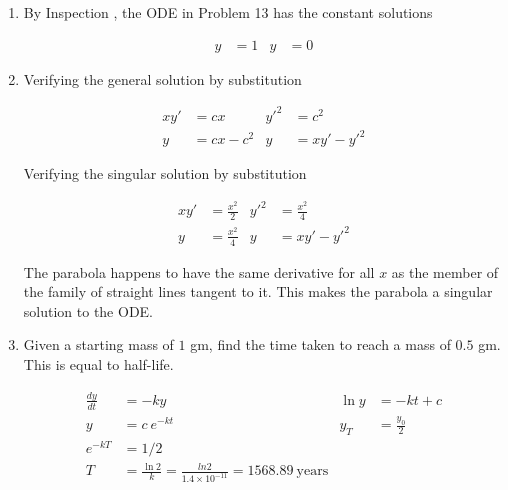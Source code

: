 \begin{enumerate}
    \item By Inspection , the ODE in Problem 13 has the constant solutions

          \begin{align}
              y & = 1 &
              y & = 0
          \end{align}


    \item Verifying the general solution by substitution

          \begin{align}
              xy'    & = cx           &
              y'^{2} & = c^{2}          \\
              y      & = cx - c^{2}   &
              y      & = xy' - y'^{2}
          \end{align}

          Verifying the singular solution by substitution

          \begin{align}
              xy'    & = \frac{x^{2}}{2} &
              y'^{2} & = \frac{x^{2}}{4}   \\
              y      & = \frac{x^{2}}{4} &
              y      & = xy' - y'^{2}
          \end{align}

          The parabola happens to have the same derivative for all $x$ as the member of
          the family of straight lines tangent to it. This makes the parabola a
          singular solution to the ODE.

    \item Given a starting mass of $1$ gm, find the time taken to reach a mass of $0.5$
          gm. This is equal to half-life.

          \begin{align}
              \frac{dy}{dt} & = -ky                                                &
              \ln y         & = -kt + c                                              \\
              y             & = c \ e^{-kt}                                        &
              y_{T}         & = \frac{y_{0}}{2}                                      \\
              e^{-kT}       & = 1/2                                                  \\
              T             & = \frac{\ln 2}{k} = \frac{ln 2}{1.4 \times 10^{-11}}
              = 1568.89\  \mathrm{years}
          \end{align}



\end{enumerate}
